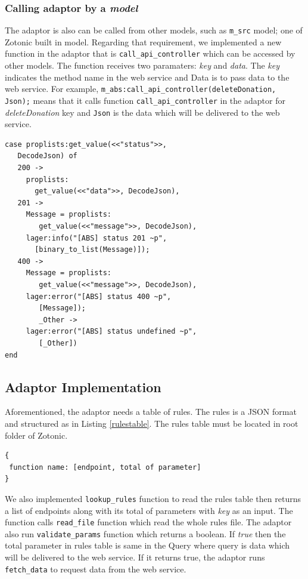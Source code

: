 \documentclass[conference]{IEEEtran}
\begin{document}
\subsubsection{Calling adaptor by a \textit{model}}
The adaptor is also can be called from other models, such as \texttt{m\_src} model; one of Zotonic built in model. Regarding that requirement, we implemented a new function in the adaptor that is \texttt{call\_api\_controller} which can be accessed by other models. The function receives two paramaters: \textit{key} and \textit{data}. The \textit{key} indicates the method name in the web service and Data is to pass data to the web service. For example, \texttt{m\_abs:call\_api\_controller(deleteDonation, Json);} means that it calls function \texttt{call\_api\_controller} in the adaptor for \textit{deleteDonation} key and \texttt{Json} is the data which will be delivered to the web service. 


\begin{lstlisting}[caption=Implementation of call\_api\_controller, label = callapicont]
 case proplists:get_value(<<"status">>, 
   DecodeJson) of 
   200 ->
     proplists:
       get_value(<<"data">>, DecodeJson),
   201 ->
     Message = proplists:
        get_value(<<"message">>, DecodeJson),
     lager:info("[ABS] status 201 ~p", 
       [binary_to_list(Message)]);
   400 ->
     Message = proplists:
        get_value(<<"message">>, DecodeJson),
     lager:error("[ABS] status 400 ~p", 
        [Message]);
        _Other ->
     lager:error("[ABS] status undefined ~p", 
        [_Other])
end
\end{lstlisting}

\subsection{Adaptor Implementation}
Aforementioned, the adaptor needs a table of rules. The rules is a JSON format and structured as in Listing \ref{rulestable}. The rules table must be located in root folder of Zotonic. 

\begin{lstlisting}[caption=Structure of Rules, label=rulestable]
{
 function name: [endpoint, total of parameter]
}
\end{lstlisting}

We also implemented \texttt{lookup\_rules} function to read the rules table then returns a list of endpoints along with its total of parameters with \textit{key} as an input. The function calls \texttt{read\_file} function which read the whole rules file. The adaptor also run \texttt{validate\_params} function which returns a boolean. If \textit{true} then the total parameter in rules table is same in the Query where query is data which will be delivered to the web service. If it returns true, the adaptor runs \texttt{fetch\_data} to request data from the web service. 
\end{document}
